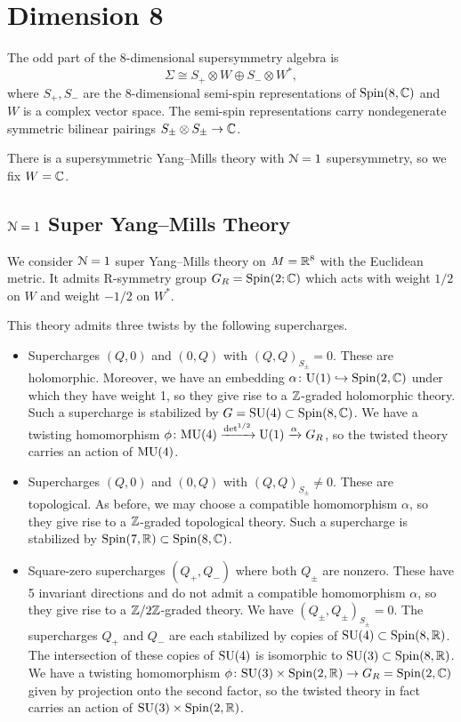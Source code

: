 \documentclass[10pt, oneside]{article}
\begin{document}
\section{Dimension 8}

The odd part of the $8$-dimensional supersymmetry algebra is 
\[
\Sigma\cong S_+\otimes W\oplus S_-\otimes W^*,
\] 
where $S_+, S_-$ are the $8$-dimensional semi-spin representations of $\mathrm{Spin}(8, \mathbb C)$ and $W$ is a complex vector space. 
The semi-spin representations carry nondegenerate symmetric bilinear pairings $S_{\pm}\otimes S_{\pm}\rightarrow \mathbb C$. 

There is a supersymmetric Yang--Mills theory with $\mathcal{N}=1$ supersymmetry, so we fix $W = \mathbb C$.

\subsection{\texorpdfstring{$\mathcal N=1$}{N=1} Super Yang--Mills Theory}

We consider $\mathcal N=1$ super Yang--Mills theory on $M=\mathbb R^8$ with the Euclidean metric. It admits R-symmetry group $G_R=\mathrm{Spin}(2; \mathbb C)$ which acts with weight $1/2$ on $W$ and weight $-1/2$ on $W^*$.

This theory admits three twists by the following supercharges.
\begin{itemize}
\item Supercharges $(Q, 0)$ and $(0, Q)$ with $(Q, Q)_{S_\pm} = 0$. These are holomorphic. Moreover, we have an embedding $\alpha\colon \mathrm{U}(1)\hookrightarrow \mathrm{Spin}(2, \mathbb C)$ under which they have weight 1, so they give rise to a $\mathbb Z$-graded holomorphic theory. Such a supercharge is stabilized by $G=\mathrm{SU}(4)\subset \mathrm{Spin}(8, \mathbb C)$. We have a twisting homomorphism $\phi\colon \mathrm{MU}(4)\xrightarrow{\det^{1/2}} \mathrm{U}(1)\xrightarrow{\alpha} G_R$, so the twisted theory carries an action of $\mathrm{MU}(4)$.

\item Supercharges $(Q, 0)$ and $(0, Q)$ with $(Q, Q)_{S_\pm}\neq 0$. These are topological. As before, we may choose a compatible homomorphism $\alpha$, so they give rise to a $\mathbb Z$-graded topological theory. Such a supercharge is stabilized by $\mathrm{Spin}(7, \mathbb R)\subset \mathrm{Spin}(8, \mathbb C)$.

\item Square-zero supercharges $(Q_+, Q_-)$ where both $Q_{\pm}$ are nonzero. These have 5 invariant directions and do not admit a compatible homomorphism $\alpha$, so they give rise to a $\mathbb Z/2\mathbb Z$-graded theory. We have $(Q_\pm, Q_\pm)_{S_\pm} = 0$. The supercharges $Q_+$ and $Q_-$ are each stabilized by copies of $\mathrm{SU}(4)\subset \mathrm{Spin}(8, \mathbb R)$.  The intersection of these copies of $\mathrm{SU}(4)$ is isomorphic to $\mathrm{SU}(3)\subset \mathrm{Spin}(8, \mathbb R)$. We have a twisting homomorphism $\phi\colon \mathrm{SU}(3)\times \mathrm{Spin}(2, \mathbb R)\rightarrow G_R=\mathrm{Spin}(2, \mathbb C)$ given by projection onto the second factor, so the twisted theory in fact carries an action of $\mathrm{SU}(3)\times \mathrm{Spin}(2, \mathbb R)$.
\end{itemize}
\end{document}

